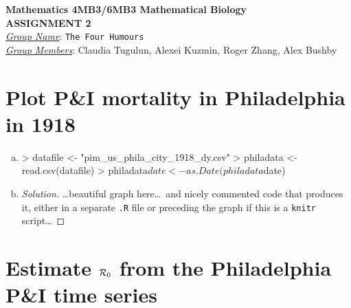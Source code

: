 \documentclass[12pt]{article}
\begin{document}


\begin{center}
{\bf Mathematics 4MB3/6MB3 Mathematical Biology\\
 ASSIGNMENT 2}\\
\medskip
\underline{\emph{Group Name}}: \texttt{{\color{blue}The Four Humours}}\\
\medskip
\underline{\emph{Group Members}}: {\color{blue}Claudia Tugulun, Alexei Kuzmin, Roger Zhang, Alex Bushby}
\end{center}

\section{Plot P\&I mortality in Philadelphia in 1918}

\begin{enumerate}[(a)]


\item \PhilaDataReadA
\begin{Schunk}
\begin{Sinput}
> datafile <- "pim_us_phila_city_1918_dy.csv"
> philadata <- read.csv(datafile)
> philadata$date <- as.Date(philadata$date)
\end{Sinput}
\end{Schunk}
\PhilaDataReadB

\item \PhilaDataReproduceA

  {\color{blue} \begin{proof}[Solution]
  {\color{magenta}\dots beautiful graph here\dots\ and nicely commented code that produces it, either in a separate \texttt{.R} file or preceding the graph if this is a \texttt{knitr} script\dots}
  \end{proof}
  }

\PhilaDataReproduceB

\end{enumerate}

\section{Estimate ${\cal R}_0$ from the Philadelphia P\&I time series}
\end{document}
